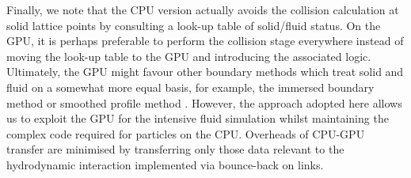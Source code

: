 Finally, we note that the CPU version actually avoids the collision calculation
at solid lattice points by consulting a look-up table of solid/fluid
status. On the GPU, it is perhaps preferable to perform the collision
stage everywhere instead of moving the look-up table to the GPU and
introducing the associated logic.
Ultimately, the GPU might favour other boundary methods which treat solid and
fluid on a somewhat more equal basis, for example, the immersed boundary
method \cite{ch14:immersed,ch14:immersed-lb} or smoothed profile method
\cite{ch14:spm}.
However, the approach adopted here  allows us to exploit
the GPU for the intensive fluid simulation whilst maintaining the complex
code required for particles on the CPU. Overheads of CPU-GPU transfer are
minimised by transferring only those data relevant to the hydrodynamic
interaction implemented via bounce-back on links.



